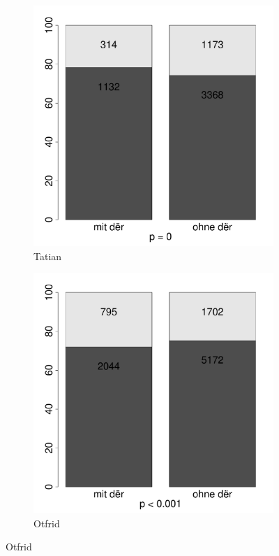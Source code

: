 \begin{figure}[p]
\begin{subfigure}[b]{.5\linewidth}
  \includegraphics[height=.25\textheight]{generated/images/numerus-tatian}
\caption {Tatian}
\end{subfigure}%
\begin{subfigure}[b]{.5\linewidth}
  \includegraphics[height=.25\textheight]{generated/images/numerus-otfrid}
\caption {Otfrid}
\end{subfigure}


\end{figure}
